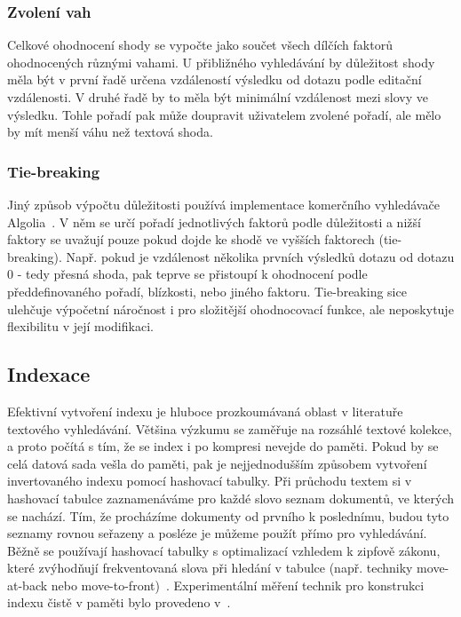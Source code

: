\documentclass[11pt,letterpaper,oneside,openright]{book}
\begin{document}
\subsubsection{Zvolení vah}
Celkové ohodnocení shody se vypočte jako součet všech dílčích faktorů
ohodnocených různými vahami. U přibližného vyhledávání by důležitost shody měla
být v první řadě určena vzdáleností výsledku od dotazu podle editační
vzdálenosti. V druhé řadě by to měla být minimální vzdálenost mezi slovy ve
výsledku. Tohle pořadí pak může doupravit uživatelem zvolené pořadí, ale mělo
by mít menší váhu než textová shoda.

\subsubsection{Tie-breaking} \label{sec:tie-breaking}
Jiný způsob výpočtu důležitosti používá implementace komerčního vyhledávače
Algolia~\cite{algolia_ranking}. V něm se určí pořadí jednotlivých faktorů podle
důležitosti a nižší faktory se uvažují pouze pokud dojde ke shodě ve vyšších
faktorech (tie-breaking). Např.  pokud je vzdálenost několika prvních výsledků
dotazu od dotazu 0 - tedy přesná shoda, pak teprve se přistoupí k ohodnocení
podle předdefinovaného pořadí, blízkosti, nebo jiného faktoru. Tie-breaking
sice ulehčuje výpočetní náročnost i pro složitější ohodnocovací funkce, ale
neposkytuje flexibilitu v její modifikaci.

\subsection{Indexace}
Efektivní vytvoření indexu je hluboce prozkoumávaná oblast v literatuře
textového vyhledávání. Většina výzkumu se zaměřuje na rozsáhlé textové kolekce,
a proto počítá s tím, že se index i po kompresi nevejde do paměti. Pokud by se
celá datová sada vešla do paměti, pak je nejjednodušším způsobem vytvoření
invertovaného indexu pomocí hashovací tabulky. Při průchodu textem si v
hashovací tabulce zaznamenáváme pro každé slovo seznam dokumentů, ve kterých se
nachází. Tím, že procházíme dokumenty od prvního k poslednímu, budou tyto
seznamy rovnou seřazeny a posléze je můžeme použít přímo pro vyhledávání. Běžně
se používají hashovací tabulky s optimalizací vzhledem k zipfově zákonu, které
zvýhodňují frekventovaná slova při hledání v tabulce (např. techniky
move-at-back nebo move-to-front)~\cite{ZOBEL2001271}. Experimentální měření
technik pro konstrukci indexu čistě v paměti bylo provedeno
v~\cite{Buttcher05memorymanagement}.
\end{document}
